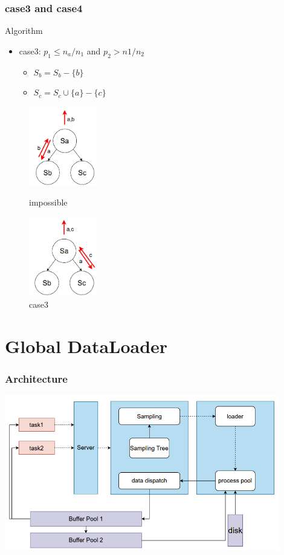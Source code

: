 \documentclass[notheorems, aspectratio=54]{beamer}
\begin{document}
\begin{frame}
    \frametitle{case3 and case4}
    \begin{block}{Algorithm}
        \begin{itemize}
            \item case3: $p_1 \leq n_a/n_1$  and  $p_2 > n1/n_2$
            \begin{itemize}
                \item $S_b = S_b - \{b\}$
                \item $S_c = S_c \cup \{a\} - \{c\}$
            \end{itemize}
        \end{itemize} 
    \end{block}
    \begin{figure}[htbp]
        \centering
        \begin{minipage}[t]{0.48\textwidth}
        \centering
        \includegraphics[width=3cm]{global_img_dir/Sampling3.png}
        \caption{impossible}
        \end{minipage}
        \begin{minipage}[t]{0.48\textwidth}
        \centering
        \includegraphics[width=3cm]{global_img_dir/Sampling4.png}
        \caption{case3}
        \end{minipage}
    \end{figure}
\end{frame}



\section{Global DataLoader}
\begin{frame}
    \frametitle{Architecture}
    \centering
    \includegraphics[width=12cm]{global_img_dir/archi.png}
\end{frame}
\end{document}
